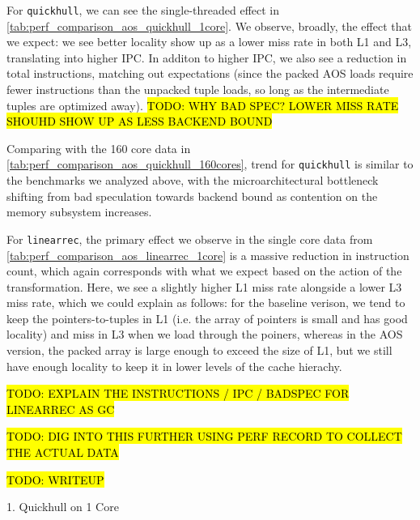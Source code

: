 \documentclass[leqno,11pt]{article}
\begin{document}
For \texttt{quickhull}, we can see the single-threaded effect in
\cref{tab:perf_comparison_aos_quickhull_1core}. We observe, broadly, the effect
that we expect: we see better locality show up as a lower miss rate in both L1
and L3, translating into higher IPC. In additon to higher IPC, we also see a
reduction in total instructions, matching out expectations (since the packed AOS
loads require fewer instructions than the unpacked tuple loads, so long as the
intermediate tuples are optimized away). \hl{TODO: WHY BAD SPEC? LOWER MISS RATE
  SHOUHD SHOW UP AS LESS BACKEND BOUND}

Comparing with the 160 core data in
\cref{tab:perf_comparison_aos_quickhull_160cores}, trend for \texttt{quickhull}
is similar to the benchmarks we analyzed above, with the microarchitectural
bottleneck shifting from bad speculation towards backend bound as contention on
the memory subsystem increases.

For \texttt{linearrec}, the primary effect we observe in the single core data
from \cref{tab:perf_comparison_aos_linearrec_1core} is a massive reduction in
instruction count, which again corresponds with what we expect based on the
action of the transformation. Here, we see a slightly higher L1 miss rate
alongside a lower L3 miss rate, which we could explain as follows: for the
baseline verison, we tend to keep the pointers-to-tuples in L1 (i.e. the array
of pointers is small and has good locality) and miss in L3 when we load through
the poiners, whereas in the AOS version, the packed array is large enough to
exceed the size of L1, but we still have enough locality to keep it in lower
levels of the cache hierachy.



\hl{TODO: EXPLAIN THE INSTRUCTIONS / IPC / BADSPEC FOR LINEARREC AS GC}

\hl{TODO: DIG INTO THIS FURTHER USING PERF RECORD TO COLLECT THE ACTUAL DATA}

\hl{TODO: WRITEUP}

  1. Quickhull on 1 Core
\end{document}
